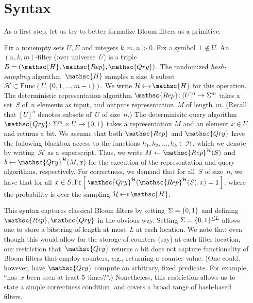 \section{Syntax}
As a first step, let us try to better formalize Bloom filters as a primitive.

Fix a nonempty sets $U,\Sigma$ and integers $k,m,n>0$.  Fix a symbol $\bot \not\in U$.  An $(n,k,m)$-filter (over universe~$U$) is a triple  $B=(\mathsc{H},\mathsc{Rep},\mathsc{Qry})$.   
%
The randomized \emph{hash-sampling} algorithm~$\mathsc{H}$ samples a size~$k$ subset~$\mathcal{H} \subset \mathrm{Func}(U,\{0,1,\ldots,m-1\})$.  We write $\mathcal{H} \getsr \mathsc{H}$ for this operation.
%
The deterministic representation algorithm $\mathsc{Rep}\colon [U]^n \rightarrow \Sigma^m$ takes a set~$S$ of~$n$ elements as input, and outputs representation~$M$ of length~$m$.  (Recall that $[U]^n$ denotes subsets of~$U$ of size~$n$.)
%
The determinisitc query algorithm $\mathsc{Qry}\colon \Sigma^m \times U \rightarrow \bits$ takes a representation $M$ and an element $x \in U$ and returns a bit.  
%
We assume that both $\mathsc{Rep}$ and $\mathsc{Qry}$ have the following blackbox access to the functions $h_1,h_2,\ldots,h_k \in \mathcal{H}$, which we denote by writing~$\mathcal{H}$ as a superscript.   Thus, we write $M \gets \mathsc{Rep}^{\mathcal{H}}(S)$ and $b \gets \mathsc{Qry}^{\mathcal{H}}(M,x)$ for the execution of the representation and query algorithms, respectively.
%
For correctness, we demand that for all~$S$ of size~$n$, we have that for all $x \in S, \Prob{\mathsc{Qry}^{\mathcal{H}}(\mathsc{Rep}^{\mathcal{H}}(S),x)=1}$, where the probability is over the sampling $\mathcal{H}\getsr\mathsc{H}$.  

This syntax captures classical Bloom filters by setting~$\Sigma=\{0,1\}$ and defining $\mathsc{Rep},\mathsc{Qry}$ in the obvious way.  Setting $\Sigma=\{0,1\}^{\leq L}$ allows one to store a bitstring of length at most~$L$ at each location.   We note that even though this would allow for the storage of counters (say) at each filter location, our restriction that~$\mathsc{Qry}$ returns a bit does not capture functionality of Bloom filters that employ counters, e.g., returning a counter value. (One could, however, have $\mathsc{Qry}$ compute an arbitrary, fixed predicate.  For example, ``has~$x$ been seen at least 5 times?''.)  Nonetheless, this restriction allows us to state a simple correctness condition, and covers a broad range of hash-based filters.

